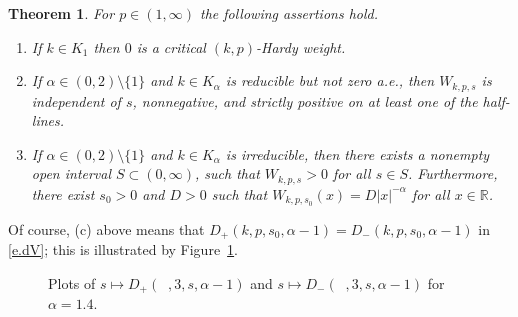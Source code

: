 \documentclass[12pt, a4paper]{amsart}
\newtheorem{theorem}{Theorem}[section]
\DeclareMathOperator{\mass}{\widetilde{\nu}_{\alpha}}
\newcommand{\R}{\mathbb{R}}
\begin{document}
\begin{theorem}
\label{theorem: sign}
For $p \in (1, \infty)$ the following assertions hold.
\begin{enumerate}
    \item[(a)]
    \label{item: sign 1}
    If $k \in K_1$ then $0$ is a critical $(k, p)$-Hardy weight.
    \item[(b)]
    \label{item: sign 2}
If \( \alpha \in (0, 2) \setminus \{1\} \) and \( k \in K_\alpha \) is reducible but not zero a.e., then \( W_{k,p,s} \) is independent of \( s \), nonnegative, and strictly positive on at least one of the half-lines.

    \item[(c)]
    \label{item: sign 2b}
    If $\alpha \in (0, 2) \setminus \{1\}$  and $k \in K_\alpha$ is irreducible, then there exists a nonempty open interval $S \subset (0, \infty)$, such that $W_{k, p, s} > 0$ for all $s \in S$. Furthermore, there exist $s_0 > 0$ and  $D > 0$ such that $W_{k, p, s_0}(x) = D|x|^{-\alpha}$ for all $x\in \R$.
\end{enumerate}
\end{theorem}
Of course, (c) above means 
that $D_+(k, p, s_0, \alpha - 1) = D_-(k, p, s_0, \alpha - 1)$ in \eqref{e.dV}; this is illustrated by Figure~\ref{fig: D alpha=1.4}. 
 \begin{figure}[H]
\caption{Plots of  $s \mapsto D_+(\mass, 3, s, \alpha-1)$ and $s \mapsto D_-(\mass, 3, s, \alpha-1)$ for $\alpha=1.4$.}
\label{fig: D alpha=1.4}
\end{figure}
\end{document}
